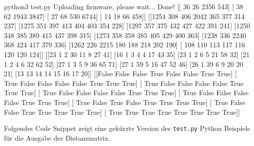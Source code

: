 \documentclass[
  11pt,
  a4paper,
  oneside, openany  ,captions=tableheading
]{scrbook}
\newenvironment{Shaded}{\begin{snugshade}}{\end{snugshade}}
\newcommand{\BuiltInTok}[1]{\textcolor[rgb]{0.00,0.23,0.31}{#1}}
\newcommand{\ErrorTok}[1]{\textcolor[rgb]{0.68,0.00,0.00}{#1}}
\newcommand{\ExtensionTok}[1]{\textcolor[rgb]{0.00,0.23,0.31}{#1}}
\newcommand{\KeywordTok}[1]{\textcolor[rgb]{0.00,0.23,0.31}{#1}}
\newcommand{\NormalTok}[1]{\textcolor[rgb]{0.00,0.23,0.31}{#1}}
\theoremstyle{remark}
\begin{document}
\begin{Shaded}
\begin{Highlighting}[]
\ExtensionTok{python3}\NormalTok{ test.py }
\ExtensionTok{Uploading}\NormalTok{ firmware, please wait...}
\ExtensionTok{Done!}
\KeywordTok{[[}\NormalTok{  36   26 2356  }\ErrorTok{543}\ExtensionTok{]}
 \BuiltInTok{[}\NormalTok{  38   62 1943 }\ErrorTok{3847}\ExtensionTok{]}
 \BuiltInTok{[}\NormalTok{  27   68  530 }\ErrorTok{6744}\ExtensionTok{]}
 \BuiltInTok{[}\NormalTok{  14   18   66  }\ErrorTok{458]]} \ExtensionTok{[[1254}\NormalTok{  308  406 2042  365  377  314  237]}
 \ExtensionTok{[1275}\NormalTok{  351  397  413  404  403  354  228]}
 \ExtensionTok{[1297}\NormalTok{  357  375  432  427  422  391  241]}
 \ExtensionTok{[1250}\NormalTok{  348  385  389  415  437  398  315]}
 \ExtensionTok{[1273}\NormalTok{  358  358  385  405  429  400  363]}
 \ExtensionTok{[1238}\NormalTok{  336 2240  368  424  417  379  336]}
 \ExtensionTok{[1262}\NormalTok{  226 2215  180  188  218  202  190]}
 \BuiltInTok{[}\NormalTok{ 108  110  113  }\ErrorTok{117}  \ExtensionTok{116}\NormalTok{  120  120  124]] [[23  1  2 30 11  8 27 41]}
 \ExtensionTok{[16}\NormalTok{  1  3  4  4 17 43 35]}
 \ExtensionTok{[23}\NormalTok{  1  2  6  5 21 58 32]}
 \ExtensionTok{[21}\NormalTok{  1  2  4  6 32 62 52]}
 \ExtensionTok{[27}\NormalTok{  1  3  5  9 36 65 71]}
 \ExtensionTok{[27}\NormalTok{  1 59  5 16 47 52 46]}
 \ExtensionTok{[26}\NormalTok{  1 39  6  9 20 20 21]}
 \ExtensionTok{[13}\NormalTok{ 13 14 14 15 16 17 20]] [[False False False  True False False  True  True]}
 \BuiltInTok{[}\NormalTok{ True False False }\ErrorTok{False} \ExtensionTok{False}\NormalTok{  True  True  True]}
 \BuiltInTok{[}\NormalTok{ True False False }\ErrorTok{False} \ExtensionTok{False}\NormalTok{  True  True  True]}
 \BuiltInTok{[}\NormalTok{ True False False }\ErrorTok{False} \ExtensionTok{False}\NormalTok{  True  True  True]}
 \BuiltInTok{[}\NormalTok{ True False False }\ErrorTok{False} \ExtensionTok{False}\NormalTok{  True  True  True]}
 \BuiltInTok{[}\NormalTok{ True False  True }\ErrorTok{False}  \ExtensionTok{True}\NormalTok{  True  True  True]}
 \BuiltInTok{[}\NormalTok{ True False False  }\ErrorTok{True}  \ExtensionTok{True}\NormalTok{  True  True  True]}
 \BuiltInTok{[}\NormalTok{ True  True  True  }\ErrorTok{True}  \ExtensionTok{True}\NormalTok{  True  True  True]]}
\end{Highlighting}
\end{Shaded}

Folgendes Code Snippet zeigt eine gekürzte Version des \texttt{test.py}
Python Beispiels für die Ausgabe der Distanzmatrix.
\end{document}

